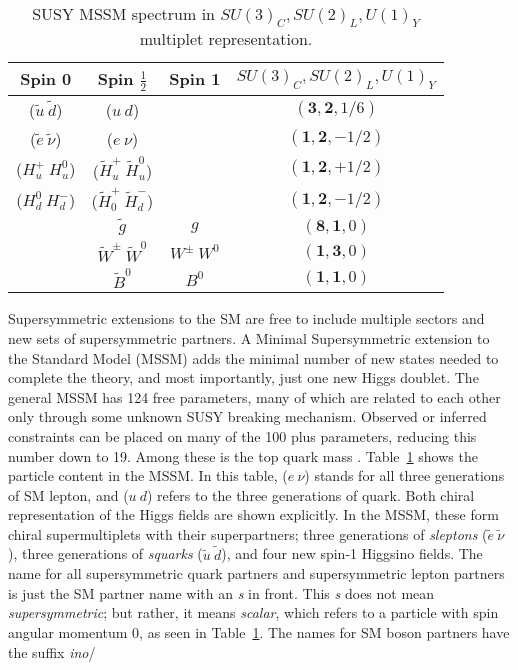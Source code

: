 \begin{table}[!htb]
\centering
\small
\begin{tabular}{|c|c|c|c|}
\hline
Spin 0  & Spin $\frac{1}{2}$& Spin 1 &  $SU(3)_{C}, SU(2)_{L}, U(1)_{Y}$ \\
\hline \hline
($\tilde{u}~\tilde{d}$) & ($u~d$)&   & $(\mathbf{3}, \mathbf{2}, 1/6)$ \\ 
\hline
($\tilde{e}~\tilde{\nu}$) & ($e~\nu$)&   & $(\mathbf{1}, \mathbf{2}, -1/2)$ \\
\hline
($H_u^+~H_u^0$)&($\tilde{H}_u^+~\tilde{H}_u^0$) && $(\mathbf{1}, \mathbf{2}, +1/2)$\\
($H_d^0~H_d^-$)&($\tilde{H}_0^+~\tilde{H}_d^-$) & &$(\mathbf{1}, \mathbf{2}, -1/2)$\\
\hline
 &$\tilde{g}$&  $g$ & $(\mathbf{8}, \mathbf{1}, 0)$ \\
\hline
& $\tilde{W}^\pm~ \tilde{W}^0$& $W^\pm~ W^0$ & $(\mathbf{1}, \mathbf{3}, 0)$  \\  
 & $\tilde{B}^0$& $B^0$ & $(\mathbf{1}, \mathbf{1}, 0)$\\ 
\hline

\hline %
\end{tabular}
\caption{SUSY MSSM spectrum in $SU(3)_{C}, SU(2)_{L}, U(1)_{Y}$ multiplet representation.}
\label{tab:susy}
\end{table}
Supersymmetric extensions to the SM are free to include multiple sectors and new sets of supersymmetric partners.  A Minimal Supersymmetric extension to the Standard Model (MSSM) adds the minimal number of new states needed to complete the theory, and most importantly, just one new Higgs doublet.  The general MSSM has 124 free parameters, many of which are related to each other only through some unknown SUSY breaking mechanism.  Observed or inferred constraints can be placed on many of the 100 plus parameters, reducing this number down to 19.  Among these is the top quark mass \cite{Bechtle2006}.  Table~\ref{tab:susy} shows the particle content in the MSSM.  In this table,  ($e~\nu$) stands for all three generations of SM lepton, and ($u~d$) refers to the three generations of quark.  Both chiral representation of the Higgs fields are shown explicitly.  In the MSSM, these form chiral supermultiplets with their superpartners; three generations of \textit{sleptons} ($\tilde{e}~\tilde{\nu}$), three generations of \textit{squarks} ($\tilde{u}~\tilde{d}$), and four new spin-1 Higgsino fields.  The name for all supersymmetric quark partners and supersymmetric lepton partners is just the SM partner name with an \textit{s} in front.  This \textit{s} does not mean \textit{supersymmetric}; but rather, it means \textit{scalar}, which refers to a particle with spin angular momentum 0, as seen in Table~\ref{tab:susy}.  The names for SM boson partners have the suffix \textit{ino}/

